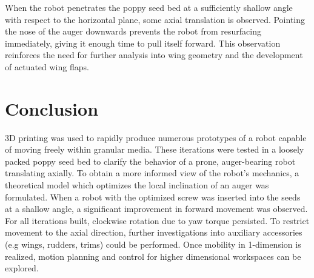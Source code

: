 \documentclass[letterpaper, 11 pt]{article}
\begin{document}
When the robot penetrates the poppy seed bed at a sufficiently shallow angle with respect to the horizontal plane, some axial translation is observed. Pointing the nose of the auger downwards prevents the robot from resurfacing immediately, giving it enough time to pull itself forward. This observation reinforces the need for further analysis into wing geometry and the development of actuated wing flaps.   

\section{Conclusion}
3D printing was used to rapidly produce numerous prototypes of a robot capable of moving freely within granular media. These iterations were tested in a loosely packed poppy seed bed to clarify the behavior of a prone, auger-bearing robot translating axially. To obtain a more informed view of the robot's mechanics, a theoretical model  which optimizes the local inclination of an auger was formulated. When a robot with the optimized screw was inserted into the seeds at a shallow angle, a significant improvement in forward movement was observed. For all iterations built, clockwise rotation due to yaw torque persisted. To restrict movement to the axial direction, further investigations into auxiliary accessories (e.g wings, rudders, trims) could be performed. Once mobility in 1-dimension is realized, motion planning and control for higher dimensional workspaces can be explored.      



\end{document}
